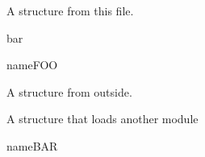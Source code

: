 \documentclass[minimal]{omdoc}
\begin{document}


A structure from this file.
\begin{modsig}{bar}
\begin{gstructure}{name}{FOO}
\end{gstructure}
\end{modsig}

A structure from outside. 
\begin{module}[id=baz]
A structure that loads another module
\begin{gstructure}{name}{BAR}
\end{gstructure}
\end{module}
\end{document}
